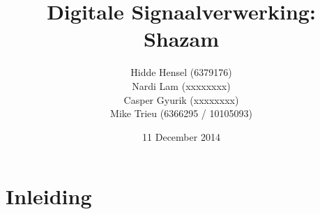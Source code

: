 \documentclass{article}
\title{Digitale Signaalverwerking: Shazam}
\author{Hidde Hensel (6379176) \\
        Nardi Lam (xxxxxxxx) \\
        Casper Gyurik (xxxxxxxx) \\
        Mike Trieu (6366295 / 10105093) }
\date{11 December 2014}
\begin{document}
\maketitle

\tableofcontents

\newpage

\section{Inleiding}
\end{document}
